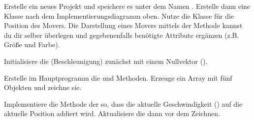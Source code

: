 \documentclass[9pt, a4paper, ngerman]{arbeitsblatt}
\begin{document}
\begin{aufgabe}[subtitle=Gravitation,icon=\iconComputer]
\label{aufg:physik}
\begin{enuma}
	\item
	Erstelle ein neues  Projekt und speichere es unter dem Namen . Erstelle dann eine Klasse  nach dem Implementierungsdiagramm oben. Nutze die  Klasse für die Position des Movers. Die Darstellung eines Movers mittels der  Methode kannst du dir selber überlegen und gegebenenfalls benötigte Attribute ergänzen (z.B. Größe und Farbe).

	Initialisiere die  (Beschleunigung) zunächst mit einem Nullvektor ().
	\item
	Erstelle im Hauptprogramm die  und  Methoden. Erzeuge ein Array mit fünf  Objekten und zeichne sie.
	\item
	{Implementiere die  Methode der  so, dass die aktuelle Geschwindigkeit () auf die aktuelle Position addiert wird. Aktualisiere die  dann vor dem Zeichnen.

}
\end{enuma}
\end{aufgabe}
\end{document}
